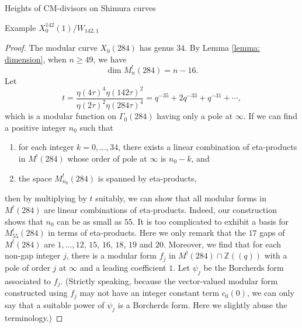 \documentclass{amsart}
\newcounter{lemma}
\theoremstyle{definition}
\def\Z{\mathbb Z}
\begin{document}
\begin{section}{Heights of CM-divisors on Shimura curves}
\begin{subsection}{Example $X_0^{142}(1)/W_{142,1}$}
\begin{proof}
 The modular curve
  $X_0(284)$ has genus $34$. By  Lemma \ref{lemma: dimension}, when
  $n\ge 49$, we have 
  $$
    \dim M^!_n(284)=n-16.
  $$
  Let
  $$
    t=\frac{\eta(4\tau)^4\eta(142\tau)^2}{\eta(2\tau)^2\eta(284\tau)^4}
     =q^{-35}+2q^{-33}+q^{-31}+\cdots,
  $$
  which is a modular function on $\Gamma_0(284)$ having only a pole at
  $\infty$. If we can find a positive integer $n_0$ such that
  \begin{enumerate}
  \item[(i)] for each integer $k=0,\ldots,34$, there exists a linear
    combination of eta-products in $M^!(284)$ whose order of pole at
    $\infty$ is $n_0-k$, and
  \item[(ii)] the space $M^!_{n_0}(284)$ is spanned by eta-products,
  \end{enumerate}
  then by multiplying by $t$ suitably, we can show that all modular
  forms in $M^!(284)$ are linear combinations of eta-products. Indeed,
  our construction shows that $n_0$ can be as small as $55$. It is too
  complicated to exhibit a basis for $M^!_{55}(284)$ in terms of
  eta-products. Here we only remark that the $17$ gaps of $M^!(284)$ are
  $1,\ldots,12$, $15$, $16$, $18$, $19$ and $20$. Moreover, we find
  that for each non-gap integer $j$, there is a modular form $f_j$ in
  $M^!(284)\cap\Z((q))$ with a pole of order $j$ at $\infty$ and a
  leading coefficient $1$. Let $\psi_j$ be the Borcherds form
  associated to $f_j$. (Strictly speaking, because the vector-valued
  modular form constructed using $f_j$ may not have an integer
  constant term $c_0(0)$, we can only say that a suitable power of
  $\psi_j$ is a Borcherds form. Here we slightly abuse the
  terminology.)


\end{proof}
\end{subsection}
\end{section}
\end{document}
